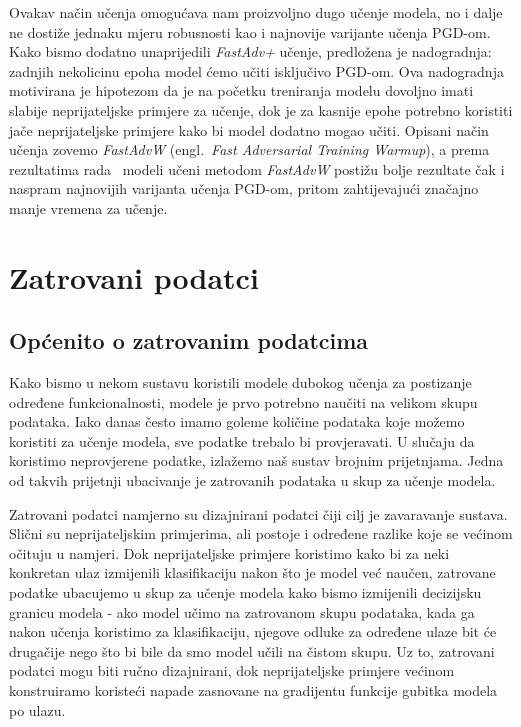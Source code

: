 \documentclass[times, utf8, zavrsni, numeric]{fer}
\begin{document}
\pagebreak

Ovakav način učenja omogućava nam proizvoljno dugo učenje modela, no i dalje ne dostiže jednaku mjeru robusnosti kao i najnovije varijante učenja PGD-om.
Kako bismo dodatno unaprijedili \textit{FastAdv+} učenje, predložena je nadogradnja: zadnjih nekolicinu epoha model ćemo učiti isključivo PGD-om. 
Ova nadogradnja motivirana je hipotezom da je na početku treniranja modelu dovoljno imati slabije neprijateljske primjere za učenje, 
dok je za kasnije epohe potrebno koristiti jače neprijateljske primjere kako bi model dodatno mogao učiti. Opisani način učenja zovemo \textit{FastAdvW} (engl.\ \textit{Fast Adversarial Training Warmup}),
a prema rezultatima rada~\cite{li2020towards} modeli učeni metodom \textit{FastAdvW} postižu bolje rezultate čak i naspram najnovijih varijanta učenja PGD-om, 
pritom zahtijevajući značajno manje vremena za učenje.

\chapter{Zatrovani podatci}

\section{Općenito o zatrovanim podatcima}

Kako bismo u nekom sustavu koristili modele dubokog učenja za postizanje određene funkcionalnosti, modele je prvo potrebno naučiti na velikom skupu podataka. 
Iako danas često imamo goleme količine podataka koje možemo koristiti za učenje modela, sve podatke trebalo bi provjeravati.
U slučaju da koristimo neprovjerene podatke, izlažemo naš sustav brojnim prijetnjama.
Jedna od takvih prijetnji ubacivanje je zatrovanih podataka u skup za učenje modela. 

Zatrovani podatci namjerno su dizajnirani podatci čiji cilj je zavaravanje sustava.
Slični su neprijateljskim primjerima, ali postoje i određene razlike koje se većinom očituju u namjeri.
Dok neprijateljske primjere koristimo kako bi za neki konkretan ulaz izmijenili klasifikaciju nakon što je model već naučen,
zatrovane podatke ubacujemo u skup za učenje modela kako bismo izmijenili decizijsku granicu modela - ako model učimo na zatrovanom skupu podataka,
kada ga nakon učenja koristimo za klasifikaciju, njegove odluke za određene ulaze bit će drugačije nego što bi bile da smo model učili na čistom skupu.
Uz to, zatrovani podatci mogu biti ručno dizajnirani, dok neprijateljske primjere većinom konstruiramo koristeći napade zasnovane na gradijentu funkcije gubitka modela po ulazu.
\end{document}
